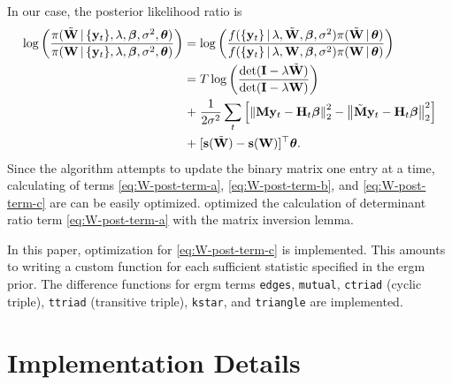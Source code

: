 \documentclass[a4paper]{article}
\begin{document}
In our case, the posterior likelihood ratio is
\begin{align}
	\log
	\left(
	\frac
	{ \pi(\tilde{\mathbf{W}}\,|\,\{\mathbf{y}_{t}\},\lambda,\boldsymbol{\beta},\sigma^2,\boldsymbol{\theta}) }
	{ \pi(\mathbf{W}\,|\,\{\mathbf{y}_{t}\},\lambda,\boldsymbol{\beta},\sigma^2,\boldsymbol{\theta}) }
	\right)
	&=
	\log
	\left(
	\frac
	{ f(\{\mathbf{y}_{t}\}\,|\,\lambda,\tilde{\mathbf{W}},\boldsymbol{\beta},\sigma^2) \pi(\tilde{\mathbf{W}}\,|\,\boldsymbol{\theta}) }
	{ f(\{\mathbf{y}_{t}\}\,|\,\lambda,\mathbf{W},\boldsymbol{\beta},\sigma^2) \pi(\mathbf{W}\,|\,\boldsymbol{\theta}) }
	\right) \nonumber\\
	&=
	T \log \left( \frac{\det(\mathbf{I}-\lambda\tilde{\mathbf{W}})}{\det(\mathbf{I}-\lambda\mathbf{W})} \right) \label{eq:W-post-term-a} \\
	&\mathrel{+}{}
	\frac1{2\sigma^2}
	\sum_{t}
	\left[
	\left\| \mathbf{M}\mathbf{y}_{t} - \mathbf{H}_{t}\boldsymbol{\beta} \right\|_{2}^{2} - \left\| \tilde{\mathbf{M}}\mathbf{y}_{t} - \mathbf{H}_{t}\boldsymbol{\beta} \right\|_{2}^{2}
	\right]
	\label{eq:W-post-term-b}\\
	&\mathrel{+}{} [\mathbf{s}(\tilde{\mathbf{W}})-\mathbf{s}(\mathbf{W})]^\top\boldsymbol{\theta}. \label{eq:W-post-term-c}
\end{align}
Since the algorithm attempts to update the binary matrix one entry at a time,
calculating of terms \eqref{eq:W-post-term-a}, \eqref{eq:W-post-term-b},
and \eqref{eq:W-post-term-c} are can be easily optimized.
\cite{krisztin-piribauer-2022} optimized the calculation of determinant ratio term \eqref{eq:W-post-term-a}
with the matrix inversion lemma.

In this paper, optimization for \eqref{eq:W-post-term-c} is implemented.
This amounts to writing a custom function for each sufficient statistic specified in the \gls{ergm} prior.
The difference functions for \gls{ergm} terms
\Verb"edges", \Verb"mutual", \Verb"ctriad" (cyclic triple), \Verb"ttriad" (transitive triple),
\Verb"kstar", and \Verb"triangle" are implemented.


\section{Implementation Details}\label{app:implementation-details}
\end{document}
